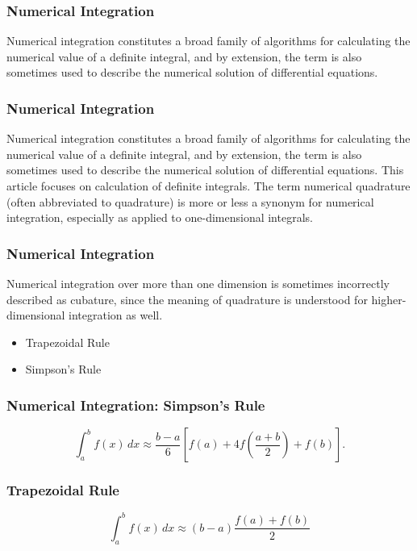 \documentclass{beamer}
\begin{document}
\begin{frame}
\frametitle{Numerical Integration}
Numerical integration constitutes a broad family of algorithms for calculating the numerical value of a definite integral, and by extension, the term is also sometimes used to describe the numerical solution of differential equations.
\end{frame}

\begin{frame}
\frametitle{Numerical Integration}
Numerical integration constitutes a broad family of algorithms for calculating the numerical value of a definite integral, and by extension, the term is also sometimes used to describe the numerical solution of differential equations.
This article focuses on calculation of definite integrals. The term numerical quadrature (often abbreviated to quadrature) is more or less a synonym for numerical integration, especially as applied to one-dimensional integrals.
\end{frame}

\begin{frame}
	\frametitle{Numerical Integration}
Numerical integration over more than one dimension is sometimes incorrectly described as cubature, since the meaning of quadrature is understood for higher-dimensional integration as well.

\begin{itemize}
\item Trapezoidal Rule
\item Simpson’s Rule
\end{itemize}

\end{frame}

\begin{frame}
\frametitle{Numerical Integration: Simpson's Rule}
\[\int_{a}^{b} f(x) \, dx \approx \frac{b-a}{6}\left[f(a) + 4f\left(\frac{a+b}{2}\right)+f(b)\right].\]

\end{frame}
\begin{frame}
\frametitle{Trapezoidal Rule}
\[\int_{a}^{b} f(x)\, dx \approx (b-a)\frac{f(a) + f(b)}{2}\]

\end{frame}
\end{document}
